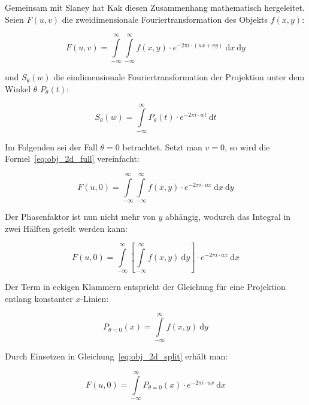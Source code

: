 Gemeinsam mit Slaney hat Kak diesen Zusammenhang mathematisch hergeleitet. Seien $F(u, v)$ die
zweidimensionale Fouriertransformation des Objekts $f(x, y)$:

\begin{equation}\label{eq:obj_2d_full}
    F(u, v) = \int\limits_{-\infty}^{\infty} \int\limits_{-\infty}^{\infty} f(x, y) \cdot e^{-2 \pi i \cdot(u x + v y)}\
        \mathrm{d} x\ \mathrm{d} y
\end{equation}

und $S_{\theta}(w)$ die eindimensionale Fouriertransformation der Projektion unter dem Winkel $\theta$ $P_{\theta}(t)$:

\begin{equation}\label{eq:proj_fft}
    S_{\theta}(w) = \int\limits_{-\infty}^{\infty} P_{\theta}(t) \cdot e^{-2 \pi i \cdot w t}\ \mathrm{d} t
\end{equation}

Im Folgenden sei der Fall $\theta = 0$ betrachtet. Setzt man $v = 0$, so wird die Formel~\ref{eq:obj_2d_full}
vereinfacht:

\begin{equation}
    F(u, 0) = \int\limits_{-\infty}^{\infty} \int\limits_{-\infty}^{\infty} f(x, y) \cdot e^{-2 \pi i \cdot u x}\
    \mathrm{d} x\ \mathrm{d} y
\end{equation}

Der Phasenfaktor ist nun nicht mehr von $y$ abhängig, wodurch das Integral in zwei Hälften geteilt werden kann:

\begin{equation}\label{eq:obj_2d_split}
    F(u, 0) = \int\limits_{-\infty}^{\infty} \left[\int\limits_{-\infty}^{\infty} f(x, y)\ \mathrm{d} y \right] \cdot
    e^{-2 \pi i \cdot u x}\ \mathrm{d} x
\end{equation}

Der Term in eckigen Klammern entspricht der Gleichung für eine Projektion entlang konstanter $x$-Linien:

\begin{equation}
    P_{\theta = 0}(x) = \int\limits_{-\infty}^{\infty} f(x, y)\ \mathrm{d} y
\end{equation}

Durch Einsetzen in Gleichung~\ref{eq:obj_2d_split} erhält man:

\begin{equation}
    F(u, 0) = \int\limits_{-\infty}^{\infty} P_{\theta = 0}(x) \cdot e^{-2 \pi i \cdot u x}\ \mathrm{d} x
\end{equation}

